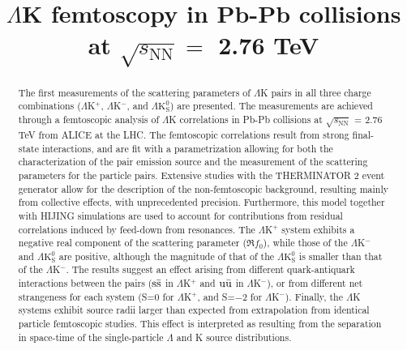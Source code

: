 \documentclass[ALICE,manyauthors]{cernphprep}
\newcommand{\LamK}{$\Lambda$K\xspace}
\begin{document}
%

\begin{titlepage}
%
%

\title{\LamK femtoscopy in Pb-Pb collisions at $\sqrt{s_{\mathrm{NN}}} = $ 2.76 TeV}
\ShortTitle{\LamK femtoscopy in Pb-Pb collisions}   %


\begin{abstract}
The first measurements of the scattering parameters of $\Lambda$K pairs in all three charge combinations ($\Lambda$K$^{+}$, $\Lambda$K$^{-}$, and $\Lambda\mathrm{K^{0}_{S}}$) are presented.
The measurements are achieved through a femtoscopic analysis of $\Lambda$K correlations in Pb-Pb collisions at $\sqrt{s_{\mathrm{NN}}}$ = 2.76 TeV from ALICE at the LHC.  
The femtoscopic correlations result from strong final-state interactions, and are fit with a parametrization allowing for both the characterization of the pair emission source and the measurement of the scattering parameters for the particle pairs.
Extensive studies with the THERMINATOR 2 event generator allow for the description of the non-femtoscopic background, resulting mainly from collective effects, with unprecedented precision.
Furthermore, this model together with HIJING simulations are used to account for contributions from residual correlations induced by feed-down from resonances.
The $\Lambda$K$^{+}$ system exhibits a negative real component of the scattering parameter ($\Re f_{0}$), while those of the $\Lambda$K$^{-}$ and $\Lambda\mathrm{K^{0}_{S}}$ are positive, although the magnitude of that of the $\Lambda\mathrm{K^{0}_{S}}$ is smaller than that of the $\Lambda$K$^{-}$.
The results suggest an effect arising from different quark-antiquark interactions between the pairs ($\rm s\bar{s}$ in $\Lambda$K$^{+}$ and $\rm u\bar{u}$ in $\Lambda$K$^{-}$), or from different net strangeness for each system (S=0 for $\Lambda$K$^{+}$, and S=$-2$ for $\Lambda$K$^{-}$).
Finally, the $\Lambda$K systems exhibit source radii larger than expected from extrapolation from identical particle femtoscopic studies.
This effect is interpreted as resulting from the separation in space-time of the single-particle $\Lambda$ and K source distributions.
\end{abstract}
\end{titlepage}
\setcounter{page}{2}
\end{document}
